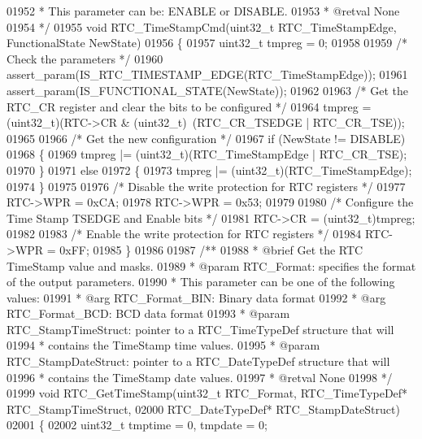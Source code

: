 \begin{DoxyCode}
01952 \textcolor{comment}{  *          This parameter can be: ENABLE or DISABLE.}
01953 \textcolor{comment}{  * @retval None}
01954 \textcolor{comment}{  */}
01955 \textcolor{keywordtype}{void} RTC_TimeStampCmd(uint32\_t RTC\_TimeStampEdge, FunctionalState NewState)
01956 \{
01957   uint32\_t tmpreg = 0;
01958 
01959   \textcolor{comment}{/* Check the parameters */}
01960   assert_param(IS\_RTC\_TIMESTAMP\_EDGE(RTC\_TimeStampEdge));
01961   assert_param(IS\_FUNCTIONAL\_STATE(NewState));
01962 
01963   \textcolor{comment}{/* Get the RTC\_CR register and clear the bits to be configured */}
01964   tmpreg = (uint32\_t)(RTC->CR & (uint32\_t)~(RTC_CR_TSEDGE | RTC_CR_TSE));
01965 
01966   \textcolor{comment}{/* Get the new configuration */}
01967   \textcolor{keywordflow}{if} (NewState != DISABLE)
01968   \{
01969     tmpreg |= (uint32\_t)(RTC\_TimeStampEdge | RTC_CR_TSE);
01970   \}
01971   \textcolor{keywordflow}{else}
01972   \{
01973     tmpreg |= (uint32\_t)(RTC\_TimeStampEdge);
01974   \}
01975 
01976   \textcolor{comment}{/* Disable the write protection for RTC registers */}
01977   RTC->WPR = 0xCA;
01978   RTC->WPR = 0x53;
01979 
01980   \textcolor{comment}{/* Configure the Time Stamp TSEDGE and Enable bits */}
01981   RTC->CR = (uint32\_t)tmpreg;
01982 
01983   \textcolor{comment}{/* Enable the write protection for RTC registers */}
01984   RTC->WPR = 0xFF;
01985 \}
01986 
01987 \textcolor{comment}{/**}
01988 \textcolor{comment}{  * @brief  Get the RTC TimeStamp value and masks.}
01989 \textcolor{comment}{  * @param  RTC\_Format: specifies the format of the output parameters.}
01990 \textcolor{comment}{  *          This parameter can be one of the following values:}
01991 \textcolor{comment}{  *            @arg RTC\_Format\_BIN: Binary data format }
01992 \textcolor{comment}{  *            @arg RTC\_Format\_BCD: BCD data format}
01993 \textcolor{comment}{  * @param RTC\_StampTimeStruct: pointer to a RTC\_TimeTypeDef structure that will }
01994 \textcolor{comment}{  *                             contains the TimeStamp time values. }
01995 \textcolor{comment}{  * @param RTC\_StampDateStruct: pointer to a RTC\_DateTypeDef structure that will }
01996 \textcolor{comment}{  *                             contains the TimeStamp date values.     }
01997 \textcolor{comment}{  * @retval None}
01998 \textcolor{comment}{  */}
01999 \textcolor{keywordtype}{void} RTC_GetTimeStamp(uint32\_t RTC\_Format, RTC\_TimeTypeDef* RTC\_StampTimeStruct,
02000                                       RTC\_DateTypeDef* RTC\_StampDateStruct)
02001 \{
02002   uint32\_t tmptime = 0, tmpdate = 0;

\end{DoxyCode}
